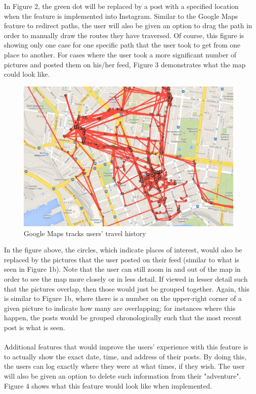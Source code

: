\documentclass[11pt]{article}
\begin{document}
   \indent In Figure 2, the green dot will be replaced by a post with a specified location when the feature is implemented into Instagram. Similar to the Google Maps feature to redirect paths, the user will also be given an option to drag the path in order to manually draw the routes they have traversed. Of course, this figure is showing only one case for one specific path that the user took to get from one place to another. For cases where the user took a more significant number of pictures and posted them on his/her feed, Figure 3 demonstrates what the map could look like. \\

\begin{figure}[ht]
\centering
\includegraphics[width=5in]{images/google_maps_tracking.png}
\caption{Google Maps tracks users' travel history}
\label{google_tracking}
\end{figure}

   \indent In the figure above, the circles, which indicate places of interest, would also be replaced by the pictures that the user posted on their feed (similar to what is seen in Figure 1b). Note that the user can still zoom in and out of the map in order to see the map more closely or in less detail. If viewed in lesser detail such that the pictures overlap, then those would just be grouped together. Again, this is similar to Figure 1b, where there is a number on the upper-right corner of a given picture to indicate how many are overlapping; for instances where this happen, the posts would be grouped chronologically such that the most recent post is what is seen.\\ \\
   \indent Additional features that would improve the users' experience with this feature is to actually show the exact date, time, and address of their posts. By doing this, the users can log exactly where they were at what times, if they wish. The user will also be given an option to delete such information from their "adventure". Figure 4 shows what this feature would look like when implemented. \\ \\
   
\end{document}
